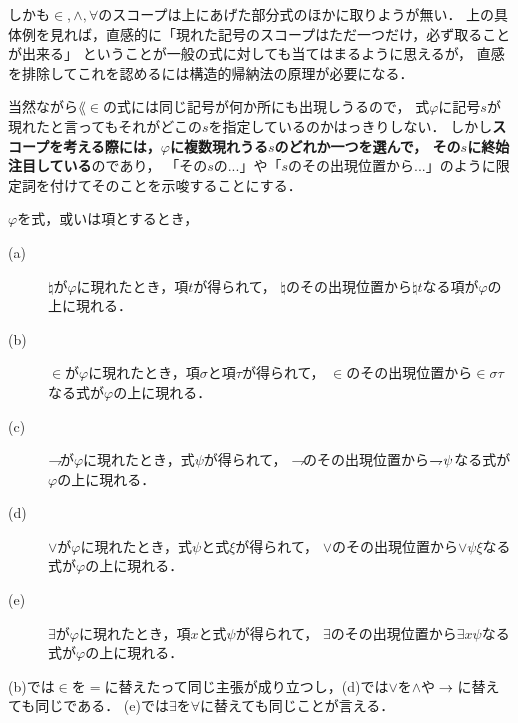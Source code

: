 	しかも$\in,\wedge,\forall$のスコープは上にあげた部分式のほかに取りようが無い．
	上の具体例を見れば，直感的に「現れた記号のスコープはただ一つだけ，必ず取ることが出来る」
	ということが一般の式に対しても当てはまるように思えるが，
	直感を排除してこれを認めるには構造的帰納法の原理が必要になる．
	
	当然ながら$\lang{\in}$の式には同じ記号が何か所にも出現しうるので，
	式$\varphi$に記号$s$が現れたと言ってもそれがどこの$s$を指定しているのかはっきりしない．
	しかし{\bf スコープを考える際には，$\varphi$に複数現れうる$s$のどれか一つを選んで，
	その$s$に終始注目している}のであり，
	「その$s$の...」や「$s$のその出現位置から...」のように限定詞を付けてそのことを示唆することにする．
	
	\begin{screen}
		\begin{metathm}[スコープの存在]\label{metathm:existence_of_scopes_L_in}
		$\varphi$を式，或いは項とするとき，
		\begin{description}
			\item[(a)] $\natural$が$\varphi$に現れたとき，項$t$が得られて，
				$\natural$のその出現位置から$\natural t$なる項が$\varphi$の上に現れる．
				
			\item[(b)] $\in$が$\varphi$に現れたとき，項$\sigma$と項$\tau$が得られて，
				$\in$のその出現位置から$\in \sigma \tau$なる式が$\varphi$の上に現れる．
				
			\item[(c)] $\rightharpoondown\hspace{-0.25em}$が$\varphi$に現れたとき，式$\psi$が得られて，
				$\rightharpoondown\hspace{-0.25em}$のその出現位置から$\rightharpoondown\hspace{-0.25em} \psi$なる式が
				$\varphi$の上に現れる．
				
			\item[(d)] $\vee$が$\varphi$に現れたとき，式$\psi$と式$\xi$が得られて，
				$\vee$のその出現位置から$\vee \psi \xi$なる式が$\varphi$の上に現れる．
				
			\item[(e)] $\exists$が$\varphi$に現れたとき，項$x$と式$\psi$が得られて，
				$\exists$のその出現位置から$\exists x \psi$なる式が$\varphi$の上に現れる．
		\end{description}
		\end{metathm}
	\end{screen}
	
	(b)では$\in$を$=$に替えたって同じ主張が成り立つし，(d)では$\vee$を$\wedge$や$\hspace{0.25em}\rightarrow\hspace{0.25em}$に替えても同じである．
	(e)では$\exists$を$\forall$に替えても同じことが言える．
	
